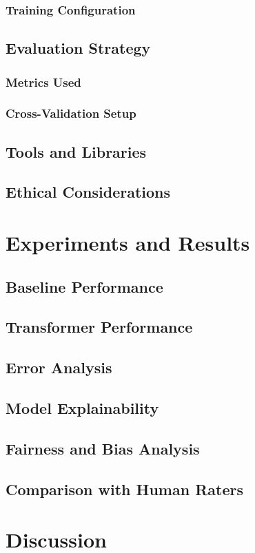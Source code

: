 \documentclass[12pt,a4paper]{report}
\begin{document}
\subsection{Training Configuration}
\section{Evaluation Strategy}
\subsection{Metrics Used}
\subsection{Cross-Validation Setup}
\section{Tools and Libraries}
\section{Ethical Considerations}

\chapter{Experiments and Results}
\section{Baseline Performance}
\section{Transformer Performance}
\section{Error Analysis}
\section{Model Explainability}
\section{Fairness and Bias Analysis}
\section{Comparison with Human Raters}

\chapter{Discussion}
\end{document}
